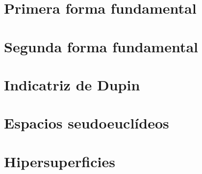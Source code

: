 \documentclass{article}
\theoremstyle{definition}
\begin{document}
\section{Primera forma fundamental}
\section{Segunda forma fundamental}
\section{Indicatriz de Dupin}

\section{Espacios seudoeuclídeos}
\section{Hipersuperficies}
\end{document}
